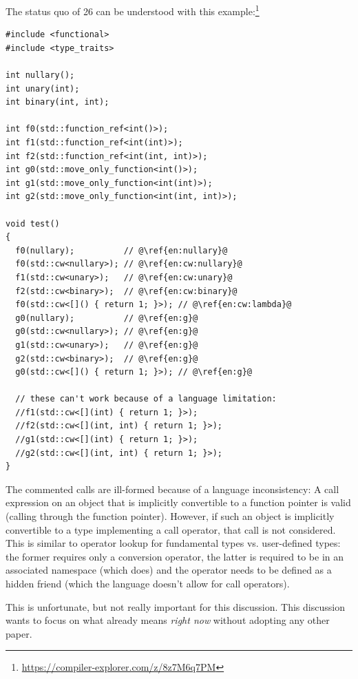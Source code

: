The status quo of \CC{}26 can be understood with this
example:\footnote{\url{https://compiler-explorer.com/z/8z7M6q7PM}}
\medskip\begin{lstlisting}
#include <functional>
#include <type_traits>

int nullary();
int unary(int);
int binary(int, int);

int f0(std::function_ref<int()>);
int f1(std::function_ref<int(int)>);
int f2(std::function_ref<int(int, int)>);
int g0(std::move_only_function<int()>);
int g1(std::move_only_function<int(int)>);
int g2(std::move_only_function<int(int, int)>);

void test()
{
  f0(nullary);          // @\ref{en:nullary}@
  f0(std::cw<nullary>); // @\ref{en:cw:nullary}@
  f1(std::cw<unary>);   // @\ref{en:cw:unary}@
  f2(std::cw<binary>);  // @\ref{en:cw:binary}@
  f0(std::cw<[]() { return 1; }>); // @\ref{en:cw:lambda}@
  g0(nullary);          // @\ref{en:g}@
  g0(std::cw<nullary>); // @\ref{en:g}@
  g1(std::cw<unary>);   // @\ref{en:g}@
  g2(std::cw<binary>);  // @\ref{en:g}@
  g0(std::cw<[]() { return 1; }>); // @\ref{en:g}@

  // these can't work because of a language limitation:
  //f1(std::cw<[](int) { return 1; }>);
  //f2(std::cw<[](int, int) { return 1; }>);
  //g1(std::cw<[](int) { return 1; }>);
  //g2(std::cw<[](int, int) { return 1; }>);
}
\end{lstlisting}

The commented calls are ill-formed because of a language inconsistency:
A call expression on an object that is implicitly convertible to a function pointer is valid
(calling through the function pointer).
However, if such an object is implicitly convertible to a type implementing a call operator, that
call is not considered.
This is similar to operator lookup for fundamental types vs. user-defined types: the former requires
only a conversion operator, the latter is required to be in an associated namespace (which
 does) and the operator needs to be defined as a hidden friend (which the
language doesn't allow for call operators).

This is unfortunate, but not really important for this discussion.
This discussion wants to focus on what  already means \emph{right now} without adopting any
other paper.

